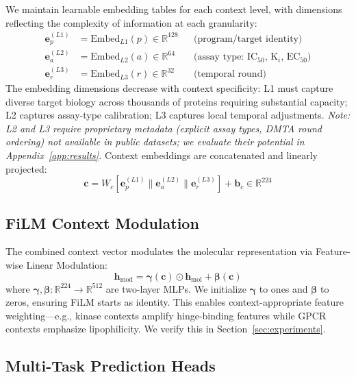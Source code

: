 \documentclass{article}
\newcommand{\hmol}{\mathbf{h}_{\text{mol}}}
\newcommand{\hmod}{\mathbf{h}_{\text{mod}}}
\begin{document}
We maintain learnable embedding tables for each context level, with dimensions reflecting the complexity of information at each granularity:
\begin{align}
    \mathbf{e}_p^{(L1)} &= \text{Embed}_{L1}(p) \in \mathbb{R}^{128} && \text{(program/target identity)} \\
    \mathbf{e}_a^{(L2)} &= \text{Embed}_{L2}(a) \in \mathbb{R}^{64} && \text{(assay type: IC$_{50}$, K$_i$, EC$_{50}$)} \\
    \mathbf{e}_r^{(L3)} &= \text{Embed}_{L3}(r) \in \mathbb{R}^{32} && \text{(temporal round)}
\end{align}
The embedding dimensions decrease with context specificity: L1 must capture diverse target biology across thousands of proteins requiring substantial capacity; L2 captures assay-type calibration; L3 captures local temporal adjustments. \textit{Note: L2 and L3 require proprietary metadata (explicit assay types, DMTA round ordering) not available in public datasets; we evaluate their potential in Appendix~\ref{app:results}.} Context embeddings are concatenated and linearly projected:
\begin{equation}
    \mathbf{c} = W_c [\mathbf{e}_p^{(L1)} \| \mathbf{e}_a^{(L2)} \| \mathbf{e}_r^{(L3)}] + \mathbf{b}_c \in \mathbb{R}^{224}
\end{equation}

\subsection{FiLM Context Modulation}

The combined context vector modulates the molecular representation via Feature-wise Linear Modulation:
\begin{equation}
    \hmod = \boldsymbol{\gamma}(\mathbf{c}) \odot \hmol + \boldsymbol{\beta}(\mathbf{c})
    \label{eq:film}
\end{equation}
where $\boldsymbol{\gamma}, \boldsymbol{\beta}: \mathbb{R}^{224} \rightarrow \mathbb{R}^{512}$ are two-layer MLPs. We initialize $\boldsymbol{\gamma}$ to ones and $\boldsymbol{\beta}$ to zeros, ensuring FiLM starts as identity. This enables context-appropriate feature weighting---e.g., kinase contexts amplify hinge-binding features while GPCR contexts emphasize lipophilicity. We verify this in Section~\ref{sec:experiments}.

\subsection{Multi-Task Prediction Heads}
\end{document}
